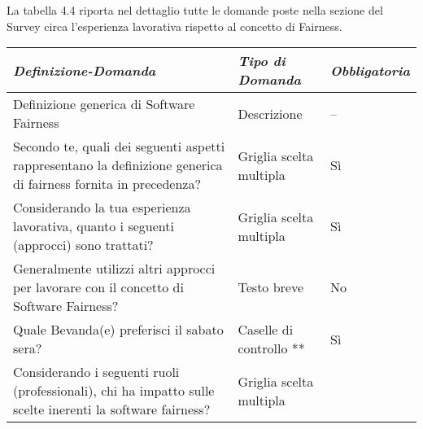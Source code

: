    La tabella 4.4 riporta nel dettaglio tutte le domande poste nella sezione del Survey circa l'esperienza lavorativa rispetto al concetto di Fairness.
   
   \begin{longtable}{| p{} | p{} | p{} |} 
        \hline\textbf{\textit{Definizione-Domanda}} & \textbf{\textit{Tipo di Domanda}} & \textbf{\textit{Obbligatoria}}\\
        \hline
        \endhead 
        
        \hline 
         Definizione generica di Software Fairness
        
        & Descrizione
        
        & --
        
        \\ \hline
        \rowcolor{Gray}
        Secondo te, quali dei seguenti aspetti rappresentano la definizione generica di fairness fornita in precedenza?
        
        &  Griglia scelta multipla
        
        & Sì
        
        \\ \hline
        
         Considerando la tua esperienza lavorativa, quanto i seguenti (approcci) sono trattati?
        
        & Griglia scelta multipla
        
        & Sì
        
        \\ \hline
        \rowcolor{Gray}
        Generalmente utilizzi altri approcci per lavorare con il concetto di Software Fairness?        
        
        &  Testo breve
        
        & No
        
        \\ 
        \hline 
         Quale Bevanda(e) preferisci il sabato sera?
        
        & Caselle di controllo **
        
        & Sì
        
        \\ \hline
        
        \rowcolor{Gray}
         Considerando i seguenti ruoli (professionali), chi ha impatto sulle scelte inerenti la software fairness?
        
        & Griglia scelta multipla 
        

\end{longtable}
